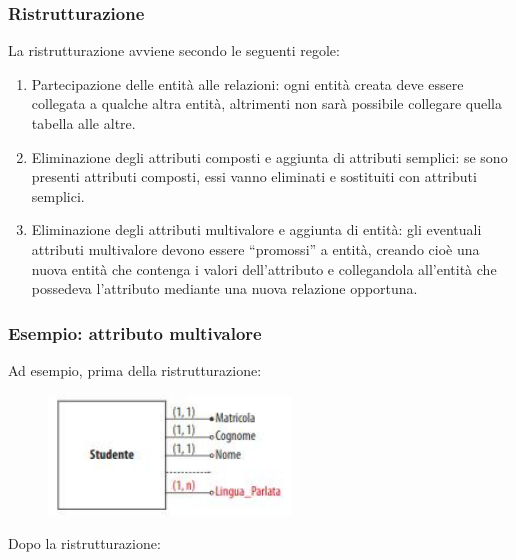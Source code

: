 \documentclass[]{beamer}
\begin{document}
\begin{frame}
\frametitle{Ristrutturazione}
La ristrutturazione avviene secondo le seguenti regole:
\begin{enumerate}
  \item \alert<1->{Partecipazione delle entità alle relazioni:} ogni entità creata deve essere collegata a qualche altra entità, altrimenti non sarà possibile collegare quella tabella alle altre. \pause
  \item \alert<2->{Eliminazione degli attributi composti e aggiunta di attributi semplici}: se sono presenti attributi composti, essi vanno eliminati e sostituiti con attributi semplici.\pause
  \item \alert<3>{Eliminazione degli attributi multivalore e aggiunta di entità}: gli eventuali attributi multivalore devono essere ``promossi'' a entità, creando cioè una nuova entità che contenga i valori dell'attributo e collegandola all'entità che possedeva l'attributo mediante una nuova relazione opportuna.
\end{enumerate}
\end{frame}


\begin{frame}
\frametitle{Esempio: attributo multivalore}
Ad esempio, prima della ristrutturazione:
\begin{figure}
  \includegraphics[width=.35\columnwidth]{img/ristrutturazione1.png}
\end{figure}\pause
Dopo la ristrutturazione:
\end{frame}
\end{document}

